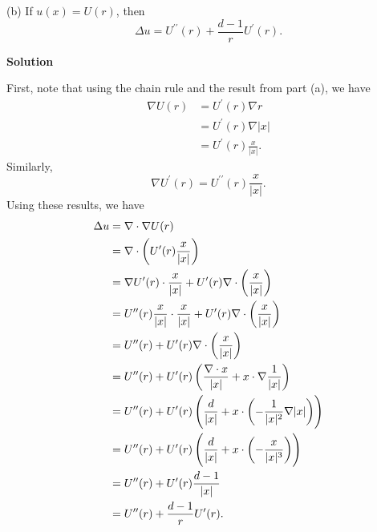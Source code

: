 \documentclass{article}
\begin{document}
\vspace{5mm}

(b) If $u(x) = U(r)$, then
%
\begin{equation*}
    \Delta u = U^{\prime \prime}(r) + \frac{d - 1}{r} U^\prime(r).
\end{equation*}

\textbf{Solution}

First, note that using the chain rule and the result from part (a), we
have
%
\begin{align*}
    \nabla U(r)
        &= U^\prime(r) \nabla r \\
        &= U^\prime(r) \nabla |x| \\
        &= U^\prime(r) \frac{x}{|x|}
        .
\end{align*}
%
Similarly,
%
\begin{equation*}
    \nabla U^\prime(r) = U^{\prime \prime}(r) \frac{x}{|x|}
    .
\end{equation*}
%
Using these results, we have
%
\begin{align*}
    \Delta u
        &= \nabla \cdot \nabla U(r) \\
        &= \nabla \cdot \del{U^\prime(r) \frac{x}{|x|}} \\
        &= \nabla U^\prime(r) \cdot \frac{x}{|x|} + U^\prime(r) \nabla \cdot \del{\frac{x}{|x|}}\\
        &= U^{\prime \prime}(r) \frac{x}{|x|} \cdot \frac{x}{|x|}
            + U^\prime(r) \nabla \cdot \del{\frac{x}{|x|}} \\
        &= U^{\prime \prime}(r) + U^\prime(r) \nabla \cdot \del{\frac{x}{|x|}} \\
        &= U^{\prime \prime}(r) + U^\prime(r)
            \del{\frac{\nabla \cdot x}{|x|} + x \cdot \nabla\frac{1}{|x|}} \\
        &= U^{\prime \prime}(r) + U^\prime(r)
            \del{\frac{d}{|x|} + x \cdot \del{-\frac{1}{|x|^2} \nabla |x|}} \\
        &= U^{\prime \prime}(r) + U^\prime(r)
            \del{\frac{d}{|x|} + x \cdot \del{-\frac{x}{|x|^3}}} \\
        &= U^{\prime \prime}(r) + U^\prime(r) \frac{d - 1}{|x|} \\
        &= U^{\prime \prime}(r) + \frac{d - 1}{r} U^\prime(r)
        .
\end{align*}

\vspace{5mm}
\end{document}
